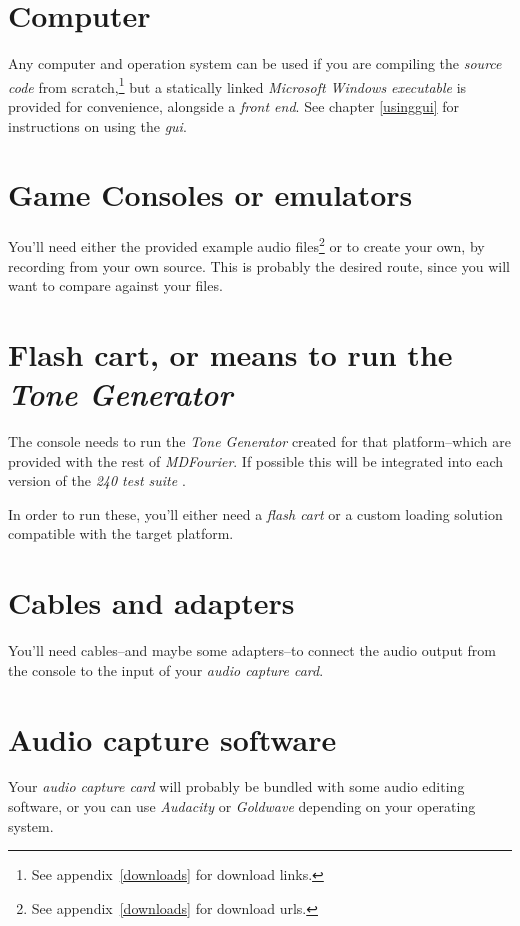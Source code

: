 \documentclass[10pt,a4paper]{report}
\newcommand{\ac}[1]{\textit{\mbox{\acrshort{#1}}}}
\begin{document}
\begin{appendices}
\section{Computer}

Any computer and operation system can be used if you are compiling the \textit{source code} from scratch,\footnote{See appendix~\ref{downloads} for download links.} but a statically linked \textit{Microsoft Windows executable} is provided for convenience, alongside a \textit{front end}. See chapter \ref{usinggui} for instructions on using the \ac{gui}.

\section{Game Consoles or emulators}

You'll need either the provided example audio files\footnote{See appendix~\ref{downloads} for download urls.} or to create your own, by recording from your own source. This is probably the desired route, since you will want to compare against your files.

\section{Flash cart, or means to run the \textit{Tone Generator}}

The console needs to run the \textit{Tone Generator} created for that platform--which are provided with the rest of \textit{MDFourier}. If possible this will be integrated into each version of the \textit{240 test suite} \cite{240pSuite}.

In order to run these, you'll either need a \textit{flash cart} or a custom loading solution compatible with the target platform.

\section{Cables and adapters}

You'll need cables--and maybe some adapters--to connect the audio output from the console to the input of your \textit{audio capture card}.

\section{Audio capture software}

Your \textit{audio capture card} will probably be bundled with some audio editing software, or you can use \textit{Audacity} \cite{audacity} or \textit{Goldwave} \cite{goldwave} depending on your operating system.


\end{appendices}
\end{document}

